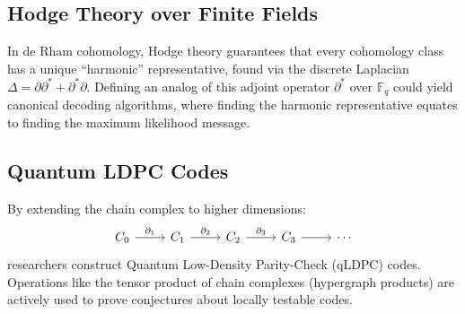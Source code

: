 \documentclass[11pt, a4paper]{article}
\newcommand{\F}{\mathbb{F}}
\begin{document}
	\subsection{Hodge Theory over Finite Fields}
	In de Rham cohomology, Hodge theory guarantees that every cohomology class has a unique ``harmonic'' representative, found via the discrete Laplacian $\Delta = \partial\partial^* + \partial^*\partial$. Defining an analog of this adjoint operator $\partial^*$ over $\F_q$ could yield canonical decoding algorithms, where finding the harmonic representative equates to finding the maximum likelihood message.
	
	\subsection{Quantum LDPC Codes}
	By extending the chain complex to higher dimensions:
	\[
	\begin{tikzcd}
		C_0 \arrow[r, "\partial_1"] & C_1 \arrow[r, "\partial_2"] & C_2 \arrow[r, "\partial_3"] & C_3 \arrow[r] & \cdots
	\end{tikzcd}
	\]
	researchers construct Quantum Low-Density Parity-Check (qLDPC) codes. Operations like the tensor product of chain complexes (hypergraph products) are actively used to prove conjectures about locally testable codes.
	
\end{document}
